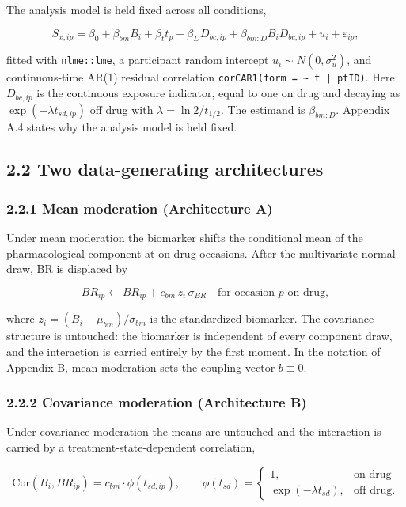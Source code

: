 \documentclass[
  11pt,
]{article}
\begin{document}
The analysis model is held fixed across all conditions,

\[
S_{x,ip} = \beta_0 + \beta_{bm} B_i + \beta_t t_p
  + \beta_D D_{bc,ip} + \beta_{bm:D} B_i D_{bc,ip}
  + u_i + \varepsilon_{ip},
\]

fitted with \texttt{nlme::lme}, a participant random intercept \(u_i
\sim N(0, \sigma_u^2)\), and continuous-time AR(1) residual
correlation \texttt{corCAR1(form = \textasciitilde\ t | ptID)}. Here
\(D_{bc,ip}\) is the continuous exposure indicator, equal to one on
drug and decaying as \(\exp(-\lambda t_{sd,ip})\) off drug with
\(\lambda = \ln 2 / t_{1/2}\). The estimand is \(\beta_{bm:D}\).
Appendix A.4 states why the analysis model is held fixed.

\subsection{2.2 Two data-generating architectures}

\subsubsection{2.2.1 Mean moderation (Architecture A)}

Under mean moderation the biomarker shifts the conditional mean of
the pharmacological component at on-drug occasions. After the
multivariate normal draw, BR is displaced by

\[
BR_{ip} \leftarrow BR_{ip} + c_{bm}\, z_i\, \sigma_{BR}
  \quad \text{for occasion } p \text{ on drug},
\]

where \(z_i = (B_i - \mu_{bm})/\sigma_{bm}\) is the standardized
biomarker. The covariance structure is untouched: the biomarker is
independent of every component draw, and the interaction is carried
entirely by the first moment. In the notation of Appendix B, mean
moderation sets the coupling vector \(b \equiv 0\).

\subsubsection{2.2.2 Covariance moderation (Architecture B)}

Under covariance moderation the means are untouched and the
interaction is carried by a treatment-state-dependent correlation,

\[
\mathrm{Cor}(B_i, BR_{ip}) = c_{bm} \cdot \phi(t_{sd,ip}), \qquad
\phi(t_{sd}) = \begin{cases}
1, & \text{on drug} \\
\exp(-\lambda t_{sd}), & \text{off drug.}
\end{cases}
\]
\end{document}
